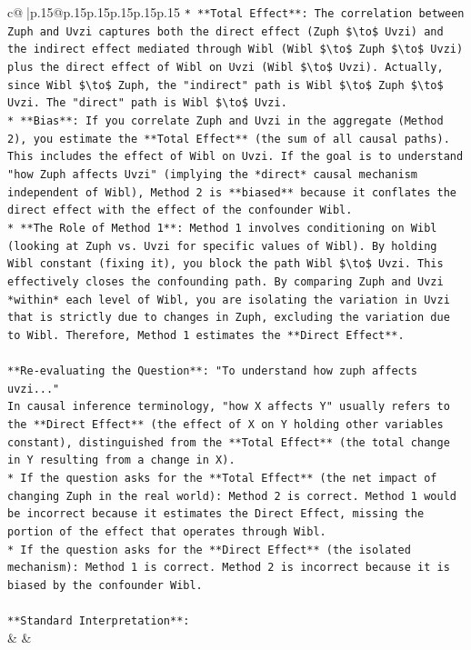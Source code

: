 \documentclass{article}
\begin{document}
{\begin{supertabular}{c@{$\;$}|p{.15\linewidth}@{}p{.15\linewidth}p{.15\linewidth}p{.15\linewidth}p{.15\linewidth}p{.15\linewidth}}
{{{\texttt{*   **Total Effect**: The correlation between Zuph and Uvzi captures both the direct effect (Zuph \$\textbackslash{}to\$ Uvzi) and the indirect effect mediated through Wibl (Wibl \$\textbackslash{}to\$ Zuph \$\textbackslash{}to\$ Uvzi) plus the direct effect of Wibl on Uvzi (Wibl \$\textbackslash{}to\$ Uvzi). Actually, since Wibl \$\textbackslash{}to\$ Zuph, the "indirect" path is Wibl \$\textbackslash{}to\$ Zuph \$\textbackslash{}to\$ Uvzi. The "direct" path is Wibl \$\textbackslash{}to\$ Uvzi.} \\
\texttt{*   **Bias**: If you correlate Zuph and Uvzi in the aggregate (Method 2), you estimate the **Total Effect** (the sum of all causal paths). This includes the effect of Wibl on Uvzi. If the goal is to understand "how Zuph affects Uvzi" (implying the *direct* causal mechanism independent of Wibl), Method 2 is **biased** because it conflates the direct effect with the effect of the confounder Wibl.} \\
\texttt{*   **The Role of Method 1**: Method 1 involves conditioning on Wibl (looking at Zuph vs. Uvzi for specific values of Wibl). By holding Wibl constant (fixing it), you block the path Wibl \$\textbackslash{}to\$ Uvzi. This effectively closes the confounding path. By comparing Zuph and Uvzi *within* each level of Wibl, you are isolating the variation in Uvzi that is strictly due to changes in Zuph, excluding the variation due to Wibl. Therefore, Method 1 estimates the **Direct Effect**.} \\
\\ 
\texttt{**Re{-}evaluating the Question**: "To understand how zuph affects uvzi..."} \\
\texttt{In causal inference terminology, "how X affects Y" usually refers to the **Direct Effect** (the effect of X on Y holding other variables constant), distinguished from the **Total Effect** (the total change in Y resulting from a change in X).} \\
\texttt{*   If the question asks for the **Total Effect** (the net impact of changing Zuph in the real world): Method 2 is correct. Method 1 would be incorrect because it estimates the Direct Effect, missing the portion of the effect that operates through Wibl.} \\
\texttt{*   If the question asks for the **Direct Effect** (the isolated mechanism): Method 1 is correct. Method 2 is incorrect because it is biased by the confounder Wibl.} \\
\\ 
\texttt{**Standard Interpretation**:} \\
            }
        }
    }
    & & \\ \\


\end{supertabular}}
\end{document}
